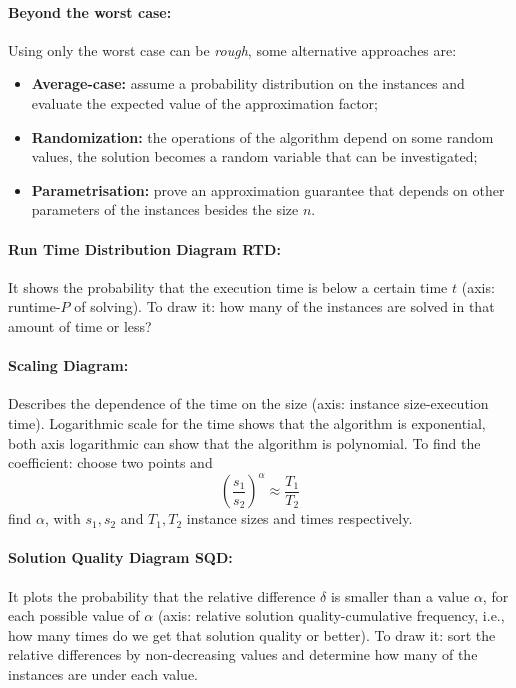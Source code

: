 \documentclass{article}
\begin{document}
	\paragraph{Beyond the worst case:} Using only the worst case can be \textit{rough}, some alternative approaches are: 
	\begin{itemize}
		\item \textbf{Average-case:} assume a probability distribution on the instances and evaluate the expected value of the approximation factor;
		\item \textbf{Randomization:} the operations of the algorithm depend on some random values, the solution becomes a random variable that can be investigated;
		\item \textbf{Parametrisation:} prove an approximation guarantee that depends on other parameters of the instances besides the size $n$.\\
	\end{itemize}
	
	\paragraph{Run Time Distribution Diagram RTD:} It shows the probability that the execution time is below a certain time $t$ (axis: runtime-$P$ of solving). To draw it: how many of the instances are solved in that amount of time or less?\\
	
	\paragraph{Scaling Diagram:} Describes the dependence of the time on the size (axis: instance size-execution time). Logarithmic scale for the time shows that the algorithm is exponential, both axis logarithmic can show that the algorithm is polynomial. To find the coefficient: choose two points and 
	$$ \left(\frac{s_1}{s_2}\right)^\alpha \approx \frac{T_1}{T_2}$$
	find $\alpha$, with $s_1, s_2$ and $T_1, T_2$ instance sizes and times respectively.\\
	
	\paragraph{Solution Quality Diagram SQD:} It plots the probability that the relative difference $\delta$ is smaller than a value $\alpha$, for each possible value of $\alpha$ (axis: relative solution quality-cumulative frequency, i.e., how many times do we get that solution quality or better). To draw it: sort the relative differences by non-decreasing values and determine how many of the instances are under each value.\\
	
\end{document}

